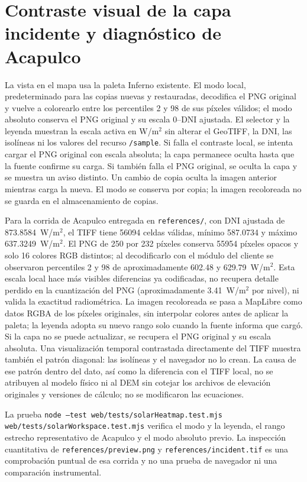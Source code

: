 \documentclass[11pt,a4paper]{article}
\begin{document}
\section{Contraste visual de la capa incidente y diagnóstico de Acapulco}
La vista en el mapa usa la paleta Inferno existente. El modo local, predeterminado para las copias nuevas y restauradas, decodifica el PNG original y vuelve a colorearlo entre los percentiles 2 y 98 de sus píxeles válidos; el modo absoluto conserva el PNG original y su escala $0$--DNI ajustada. El selector y la leyenda muestran la escala activa en W/m$^2$ sin alterar el GeoTIFF, la DNI, las isolíneas ni los valores del recurso \texttt{/sample}. Si falla el contraste local, se intenta cargar el PNG original con escala absoluta; la capa permanece oculta hasta que la fuente confirme su carga. Si también falla el PNG original, se oculta la capa y se muestra un aviso distinto. Un cambio de copia oculta la imagen anterior mientras carga la nueva. El modo se conserva por copia; la imagen recoloreada no se guarda en el almacenamiento de copias.

Para la corrida de Acapulco entregada en \texttt{references/}, con DNI ajustada de 873.8584~W/m$^2$, el TIFF tiene 56094 celdas válidas, mínimo 587.0734 y máximo 637.3249~W/m$^2$. El PNG de 250 por 232 píxeles conserva 55954 píxeles opacos y solo 16 colores RGB distintos; al decodificarlo con el módulo del cliente se observaron percentiles 2 y 98 de aproximadamente 602.48 y 629.79~W/m$^2$. Esta escala local hace más visibles diferencias ya codificadas, no recupera detalle perdido en la cuantización del PNG (aproximadamente 3.41~W/m$^2$ por nivel), ni valida la exactitud radiométrica. La imagen recoloreada se pasa a MapLibre como datos RGBA de los píxeles originales, sin interpolar colores antes de aplicar la paleta; la leyenda adopta su nuevo rango solo cuando la fuente informa que cargó. Si la capa no se puede actualizar, se recupera el PNG original y su escala absoluta. Una visualización temporal contrastada directamente del TIFF muestra también el patrón diagonal: las isolíneas y el navegador no lo crean. La causa de ese patrón dentro del dato, así como la diferencia con el TIFF local, no se atribuyen al modelo físico ni al DEM sin cotejar los archivos de elevación originales y versiones de cálculo; no se modificaron las ecuaciones.

La prueba \texttt{node --test web/tests/solarHeatmap.test.mjs web/tests/solarWorkspace.test.mjs} verifica el modo y la leyenda, el rango estrecho representativo de Acapulco y el modo absoluto previo. La inspección cuantitativa de \texttt{references/preview.png} y \texttt{references/incident.tif} es una comprobación puntual de esa corrida y no una prueba de navegador ni una comparación instrumental.
\end{document}
